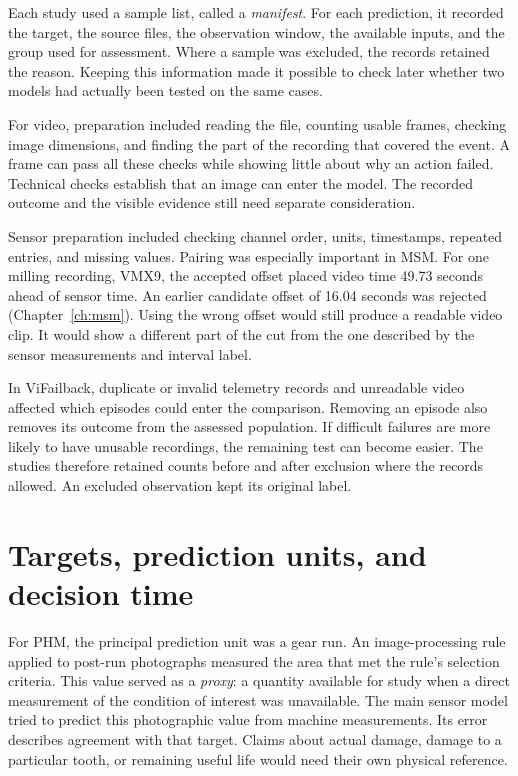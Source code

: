 Each study used a sample list, called a \emph{manifest}. For each prediction, it
recorded the target, the source files, the observation window, the available inputs, and
the group used for assessment. Where a sample was excluded, the records retained the
reason. Keeping this information made it possible to check later whether two models had
actually been tested on the same cases.

For video, preparation included reading the file, counting usable frames, checking image
dimensions, and finding the part of the recording that covered the event. A frame can
pass all these checks while showing little about why an action failed. Technical checks
establish that an image can enter the model. The recorded outcome and the visible
evidence still need separate consideration.

Sensor preparation included checking channel order, units, timestamps, repeated entries,
and missing values. Pairing was especially important in MSM. For one milling recording,
VMX9, the accepted offset placed video time 49.73 seconds ahead of sensor time. An
earlier candidate offset of 16.04 seconds was rejected (Chapter~\ref{ch:msm}). Using the
wrong offset would still produce a readable video clip. It would show a different part
of the cut from the one described by the sensor measurements and interval label.

In ViFailback, duplicate or invalid telemetry records and unreadable video affected
which episodes could enter the comparison. Removing an episode also removes its outcome
from the assessed population. If difficult failures are more likely to have unusable
recordings, the remaining test can become easier. The studies therefore retained counts
before and after exclusion where the records allowed. An excluded observation kept its
original label.

\section{Targets, prediction units, and decision time}
\label{sec:ch4-targets}

For PHM, the principal prediction unit was a gear run. An image-processing rule applied
to post-run photographs measured the area that met the rule’s selection criteria. This
value served as a \emph{proxy}: a quantity available for study when a direct measurement
of the condition of interest was unavailable. The main sensor model tried to predict
this photographic value from machine measurements. Its error describes agreement with
that target. Claims about actual damage, damage to a particular tooth, or remaining
useful life would need their own physical reference.

